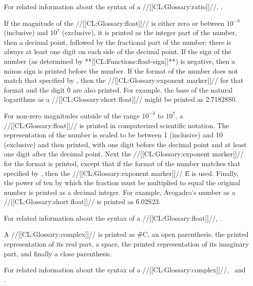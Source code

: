 For related information about the syntax of a //[[CL:Glossary:ratio]]//,
\seesection\SyntaxOfRatios.

\endsubsubsubsection%


If the magnitude of the //[[CL:Glossary:float]]// is either zero or between $10^{-3}$ (inclusive)
and $10^7$ (exclusive), it is printed as the integer part of the number,
then a decimal point,
followed by the fractional part of the number;
there is always at least one
digit on each side of the decimal point.    
If the sign of the number
(as determined by **[[CL:Functions:float-sign]]**)
is negative, then a minus sign is printed before the number.
If the format of the number
does not match that specified by
, then the //[[CL:Glossary:exponent marker]]// for
that format and the digit \f{0} are also printed.
For example, the base of the natural logarithms as a //[[CL:Glossary:short float]]//
might be printed as \f{2.71828S0}.


For non-zero magnitudes outside of the range $10^{-3}$ to $10^7$,
a //[[CL:Glossary:float]]// is printed in computerized scientific notation.
The representation of the number is scaled to be between
1 (inclusive) and 10 (exclusive) and then printed, with one digit
before the decimal point and at least one digit after the decimal point.
Next the //[[CL:Glossary:exponent marker]]// for the format is printed,
except that
if the format of the number matches that specified by 
, then the //[[CL:Glossary:exponent marker]]// \f{E}
is used.
Finally, the power of ten by which the fraction must be multiplied
to equal the original number is printed as a decimal integer.
For example, Avogadro's number as a //[[CL:Glossary:short float]]// 
is printed as \f{6.02S23}.

For related information about the syntax of a //[[CL:Glossary:float]]//,
\seesection\SyntaxOfFloats.

\endsubsubsubsection%


A //[[CL:Glossary:complex]]// is printed as \f{\#C}, an open parenthesis,
the printed representation of its real part, a space,
the printed representation of its imaginary part, and finally
a close parenthesis.

For related information about the syntax of a //[[CL:Glossary:complex]]//,
\seesection\SyntaxOfComplexes\ and \secref\SharpsignC.

